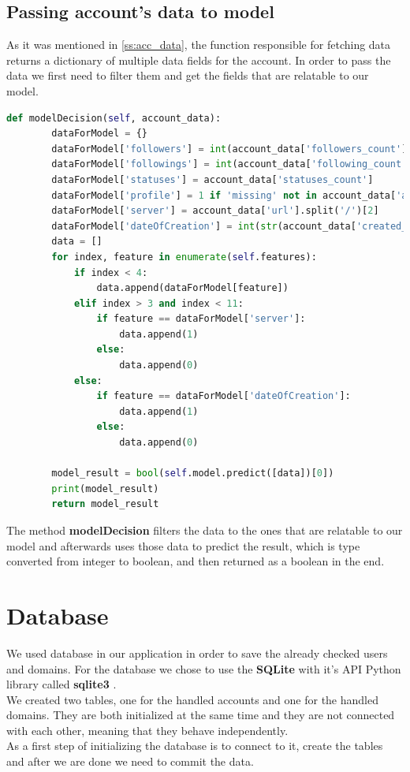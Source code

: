 \subsection{Passing account's data to model}
As it was mentioned in \ref{ss:acc_data}, the function responsible for fetching data returns a dictionary of
multiple data fields for the account. In order to pass the data we first need to filter them and get the fields
that are relatable to our model. 
\\[5pt]
\begin{lstlisting}[language=python, caption={Method that returns the model decision}, captionpos=b]
	def modelDecision(self, account_data):
		dataForModel = {}
		dataForModel['followers'] = int(account_data['followers_count'])
		dataForModel['followings'] = int(account_data['following_count'])
		dataForModel['statuses'] = account_data['statuses_count']
		dataForModel['profile'] = 1 if 'missing' not in account_data['avatar'].split('/') else 0
		dataForModel['server'] = account_data['url'].split('/')[2]
		dataForModel['dateOfCreation'] = int(str(account_data['created_at']).split('-')[0])
		data = []
		for index, feature in enumerate(self.features):
			if index < 4:
				data.append(dataForModel[feature])
			elif index > 3 and index < 11:
				if feature == dataForModel['server']:
					data.append(1)
				else:
					data.append(0)
			else:
				if feature == dataForModel['dateOfCreation']:
					data.append(1)
				else:
					data.append(0)
	
		model_result = bool(self.model.predict([data])[0])
		print(model_result)
		return model_result
\end{lstlisting}
The method \textbf{modelDecision} filters the data to the ones that are relatable to our model and
afterwards uses those data to predict the result, which is type converted from integer to boolean, and then
returned as a boolean in the end.
\section{Database}
We used database in our application in order to save the already checked users and domains. For the database
we chose to use the \textbf{SQLite} \cite{sqlite} with it's API Python library called \textbf{sqlite3} \cite{sqllite3}.
\\[5pt]
We created two tables, one for the handled accounts and one for the handled domains. They are both initialized at the same time
and they are not connected with each other, meaning that they behave independently.
\\[5pt]
As a first step of initializing the database is to connect to it, create the tables and after we are done we need to commit the data.
